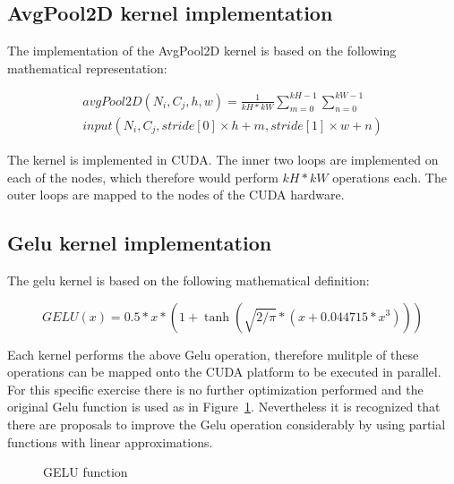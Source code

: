 \documentclass[letterpaper]{article}
\begin{document}
\subsection{AvgPool2D kernel implementation}
The implementation of the AvgPool2D kernel is based on the following mathematical representation:

\begin{equation}
\begin{aligned}
\label{eq::avgPoolEq} 
avgPool2D(N_i, C_j, h, w)  =  \frac{1}{kH * kW}  \sum_{m=0}^{kH-1} \sum_{n=0}^{kW-1} \\
                               input(N_i, C_j, stride[0] \times h + m, stride[1] \times w + n)
\end{aligned}
\end{equation}


The kernel is implemented in CUDA. The inner two loops are implemented on each of the nodes, which therefore would perform \(kH *kW\) operations each. The outer loops are mapped to the nodes of the CUDA hardware.  

\subsection{Gelu kernel implementation}

The gelu kernel is based on the following mathematical definition:  

\begin{equation}
\label{eq::geluEq} 
GELU(x) = 0.5 * x * (1 + \tanh(\sqrt{2 / \pi} * (x + 0.044715 * x^3)))
\end{equation}



Each kernel performs the above Gelu operation, therefore mulitple of these operations can be mapped onto the CUDA platform to be executed in parallel. For this specific exercise there is no further optimization performed and the original Gelu function is used as in Figure~\ref{geluFunc}. Nevertheless it is recognized that there are proposals to improve the Gelu operation considerably by using partial functions with linear approximations. 

\begin{figure}
\caption{GELU function}
\label{geluFunc}
\end{figure}
\end{document}
